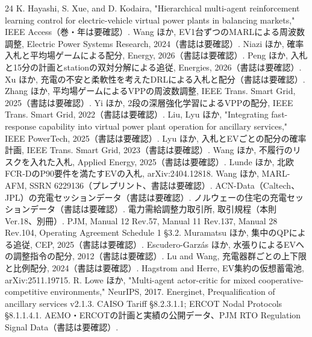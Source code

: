 \documentclass[lettersize,journal]{IEEEtran}
\begin{document}
\begin{thebibliography}{24}
 K. Hayashi, S. Xue, and D. Kodaira, "Hierarchical multi-agent reinforcement learning control for electric-vehicle virtual power plants in balancing markets," IEEE Access（巻・年は要確認）.
 Wang ほか, EV1台ずつのMARLによる周波数調整, Electric Power Systems Research, 2024（書誌は要確認）.
 Niazi ほか, 確率入札と平均場ゲームによる配分, Energy, 2026（書誌は要確認）.
 Peng ほか, 入札と15分の計画とstationの双対分解による追従, Energies, 2026（書誌は要確認）.
 Xu ほか, 充電の不安と柔軟性を考えたDRLによる入札と配分（書誌は要確認）.
 Zhang ほか, 平均場ゲームによるVPPの周波数調整, IEEE Trans. Smart Grid, 2025（書誌は要確認）.
 Yi ほか, 2段の深層強化学習によるVPPの配分, IEEE Trans. Smart Grid, 2022（書誌は要確認）.
 Liu, Lyu ほか, "Integrating fast-response capability into virtual power plant operation for ancillary services," IEEE PowerTech, 2025（書誌は要確認）.
 Lyu ほか, 入札とEVごとの配分の確率計画, IEEE Trans. Smart Grid, 2023（書誌は要確認）.
 Wang ほか, 不履行のリスクを入れた入札, Applied Energy, 2025（書誌は要確認）.
 Lunde ほか, 北欧FCR-DのP90要件を満たすEVの入札, arXiv:2404.12818.
 Wang ほか, MARL-AFM, SSRN 6229136（プレプリント、書誌は要確認）.
 ACN-Data（Caltech、JPL）の充電セッションデータ（書誌は要確認）.
 ノルウェーの住宅の充電セッションデータ（書誌は要確認）.
 電力需給調整力取引所, 取引規程（本則 Ver.18、別冊）.
 PJM, Manual 12 Rev.57, Manual 11 Rev.137, Manual 28 Rev.104, Operating Agreement Schedule 1 §3.2.
 Muramatsu ほか, 集中のQPによる追従, CEP, 2025（書誌は要確認）.
 Escudero-Garzás ほか, 水張りによるEVへの調整指令の配分, 2012（書誌は要確認）.
 Lu and Wang, 充電器群ごとの上下限と比例配分, 2024（書誌は要確認）.
 Hagstrom and Herre, EV集約の仮想蓄電池, arXiv:2511.19715.
 R. Lowe ほか, "Multi-agent actor-critic for mixed cooperative-competitive environments," NeurIPS, 2017.
 Energinet, Prequalification of ancillary services v2.1.3.
 CAISO Tariff §8.2.3.1.1; ERCOT Nodal Protocols §8.1.1.4.1.
 AEMO・ERCOTの計画と実績の公開データ、PJM RTO Regulation Signal Data（書誌は要確認）.
\end{thebibliography}
\end{document}
